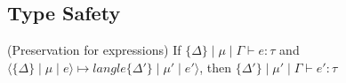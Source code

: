 \subsection{Type Safety}
\begin{lemma} (Preservation for expressions)
If $\{\Delta\}\mid \mu \mid \Gamma \vdash e : \tau$ and $\langle \{\Delta\} \mid \mu \mid e \rangle \mapsto  langle \{\Delta'\} \mid \mu' \mid e' \rangle$, then $\{\Delta'\}\mid \mu' \mid \Gamma \vdash e' : \tau$

\begin{comment}
\begin{proof} (Sketch)
By induction on the reduction rule:
\begin{enumerate}
\item (E-New) The object initialization is transformed to a location $l$. According to the typing rule. The type of the location should be identical to the type of the object.
\item (E-EmbedExp1) Follows immediately by applying IH
\item (E-EmbedExp2) 
\end{enumerate}
\end{proof}
\end{comment}

\end{lemma}



